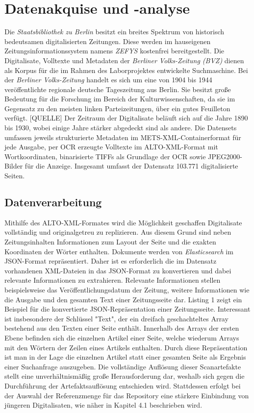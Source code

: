 \documentclass[11pt,a4paper, halfparskip]{scrartcl}
\begin{document}
\section{Datenakquise und -analyse}

Die \textit{Staatsbibliothek zu Berlin} besitzt ein breites Spektrum von historisch bedeutsamen digitalisierten Zeitungen.
Diese werden im hauseigenen Zeitungsinformationssystem namens \textit{ZEFYS} kostenfrei bereitgestellt.
Die Digitalisate, Volltexte und Metadaten der \textit{Berliner Volks-Zeitung (BVZ)} dienen als Korpus für die im Rahmen des Laborprojektes entwickelte Suchmaschine.
Bei der \textit{Berliner Volks-Zeitung} handelt es sich um eine von 1904 bis 1944 veröffentlichte regionale deutsche Tageszeitung aus Berlin.
Sie besitzt große Bedeutung für die Forschung im Bereich der Kulturwissenschaften, da sie im Gegensatz zu den meisten linken Parteizeitungen, über ein gutes Feuilleton verfügt. [QUELLE]
Der Zeitraum der Digitalisate beläuft sich auf die Jahre 1890 bis 1930, wobei einige Jahre stärker abgedeckt sind als andere.
Die Datensets umfassen jeweils strukturierte Metadaten im METS-XML-Containerformat für jede Ausgabe, per OCR erzeugte Volltexte im ALTO-XML-Format mit Wortkoordinaten, binarisierte TIFFs als Grundlage der OCR sowie JPEG2000-Bilder für die Anzeige.
Insgesamt umfasst der Datensatz 103.771 digitalisierte Seiten.

\subsection{Datenverarbeitung}

Mithilfe des ALTO-XML-Formates wird die Möglichkeit geschaffen Digitalisate vollständig und originalgetreu zu replizieren. 
Aus diesem Grund sind neben Zeitungsinhalten Informationen zum Layout der Seite und die exakten Koordinaten der Wörter enthalten.
Dokumente werden von \textit{Elasticsearch} im JSON-Format repräsentiert.
Daher ist es erforderlich die im Datensatz vorhandenen XML-Dateien in das JSON-Format zu konvertieren und dabei relevante Informationen zu extrahieren.
Relevante Informationen stellen beispielsweise das Veröffentlichungsdatum der Zeitung, weitere Informationen wie die Ausgabe und den gesamten Text einer Zeitungsseite dar.
Listing 1 zeigt ein Beispiel für die konvertierte JSON-Repräsentation einer Zeitungsseite.
Interessant ist insbesondere der Schlüssel "Text", der ein dreifach geschachteltes Array bestehend aus den Texten einer Seite enthält.
Innerhalb des Arrays der ersten Ebene befinden sich die einzelnen Artikel einer Seite, welche wiederum Arrays mit den Wörtern der Zeilen eines Artikels enthalten.
Durch diese Repräsentation ist man in der Lage die einzelnen Artikel statt einer gesamten Seite als Ergebnis einer Suchanfrage auszugeben.
Die vollständige Auflösung dieser Scanartefakte stellt eine unverhältnismäßig große Herausforderung dar, weshalb sich gegen die Durchführung der Artefaktsauflösung entschieden wird. 
Stattdessen erfolgt bei der Auswahl der Referenzmenge für das Repository eine stärkere Einbindung von jüngeren Digitalisaten, wie näher in Kapitel 4.1 beschrieben wird.
\end{document}
